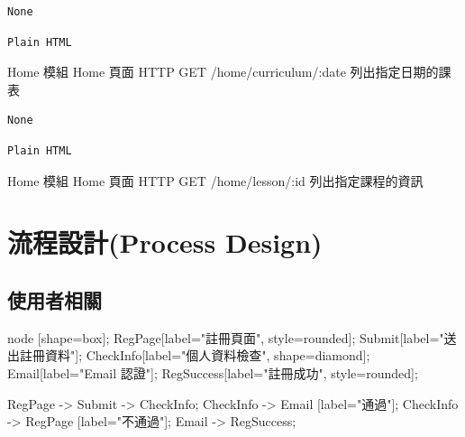 \documentclass{article}
\begin{document}
\bigskip

\begin{lrbox}{\jsoninputbox}
	\begin{lstlisting}
None
\end{lstlisting}
\end{lrbox}

\begin{lrbox}{\jsonoutputbox}
	\begin{lstlisting}
Plain HTML
\end{lstlisting}
\end{lrbox}

{Home 模組}
{Home 頁面}
{HTTP GET}
{/home/curriculum/:date}
{列出指定日期的課表}

\bigskip

\begin{lrbox}{\jsoninputbox}
	\begin{lstlisting}
None
\end{lstlisting}
\end{lrbox}

\begin{lrbox}{\jsonoutputbox}
	\begin{lstlisting}
Plain HTML
\end{lstlisting}
\end{lrbox}

{Home 模組}
{Home 頁面}
{HTTP GET}
{/home/lesson/:id}
{列出指定課程的資訊}

\newpage

\section[流程設計(PROCESS DESIGN)]{流程設計(Process Design)}

\subsection{使用者相關}

\begin{center}

	 {
		node [shape=box];
		RegPage[label="註冊頁面", style=rounded];
		Submit[label="送出註冊資料"];
		CheckInfo[label="個人資料檢查", shape=diamond];
		Email[label="Email 認證"];
		RegSuccess[label="註冊成功", style=rounded];

		RegPage -> Submit -> CheckInfo;
		CheckInfo -> Email [label="通過"];
		CheckInfo -> RegPage [label="不通過"];
		Email -> RegSuccess;
	}
\end{center}
\end{document}
